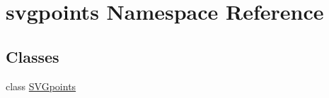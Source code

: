 \hypertarget{namespacesvgpoints}{}\section{svgpoints Namespace Reference}
\label{namespacesvgpoints}
\subsection*{Classes}
\begin{DoxyCompactItemize}
\item 
class \hyperlink{classsvgpoints_1_1_s_v_gpoints}{S\+V\+Gpoints}
\end{DoxyCompactItemize}
